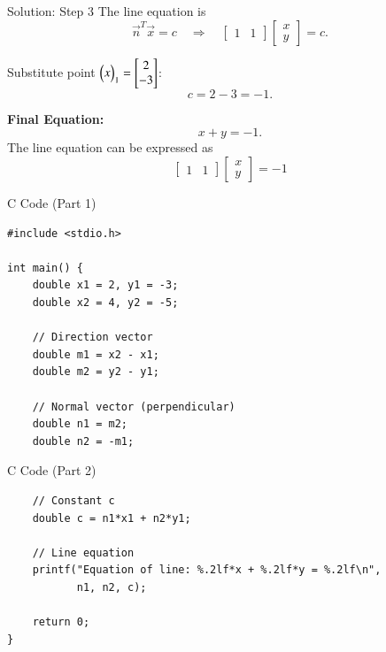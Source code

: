 \documentclass{beamer}
\begin{document}
\begin{frame}{Solution: Step 3}
The line equation is
\begin{equation}
\vec{n}^T \vec{x} = c
\quad \Rightarrow \quad
\begin{bmatrix}1 & 1\end{bmatrix}
\begin{bmatrix}x \\ y\end{bmatrix} = c.
\end{equation}

Substitute point $\begin{pmatrix}x\end{pmatrix}_1 = \begin{bmatrix}2\\-3\end{bmatrix}$:
\begin{equation}
c = 2 - 3 = -1.
\end{equation}

\bigskip
\textbf{Final Equation:}
\begin{equation}
x + y = -1.
\end{equation}
The line equation can be expressed as
\begin{equation}
\begin{bmatrix}1 & 1\end{bmatrix}
\begin{bmatrix}x \\ y\end{bmatrix} = -1
\end{equation}
\end{frame}



\begin{frame}[fragile]{C Code (Part 1)}
\lstset{language=C}
\begin{lstlisting}
#include <stdio.h>

int main() {
    double x1 = 2, y1 = -3;
    double x2 = 4, y2 = -5;

    // Direction vector
    double m1 = x2 - x1;
    double m2 = y2 - y1;

    // Normal vector (perpendicular)
    double n1 = m2;
    double n2 = -m1;
\end{lstlisting}
\end{frame}

\begin{frame}[fragile]{C Code (Part 2)}
\lstset{language=C}
\begin{lstlisting}
    // Constant c
    double c = n1*x1 + n2*y1;

    // Line equation
    printf("Equation of line: %.2lf*x + %.2lf*y = %.2lf\n",
           n1, n2, c);

    return 0;
}
\end{lstlisting}
\end{frame}
\end{document}
